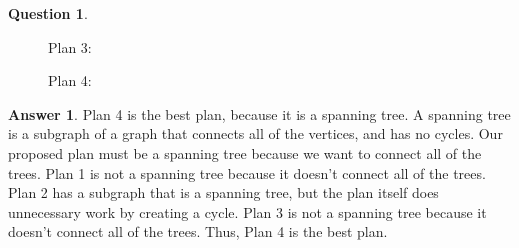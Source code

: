 \documentclass[article, 12pt]{article}
\theoremstyle{definition}
\newtheorem{question}{Question}
\newtheorem{answer}{Answer}
\begin{document}
\begin{question}
\begin{figure}[H]
\begin{minipage}[b]{0.2\linewidth}
            \end{minipage}
            \begin{minipage}[b]{0.2\linewidth}
                \caption*{Plan 3:}
                \centering
            \end{minipage}
            \begin{minipage}[b]{0.2\linewidth}
                \caption*{Plan 4:}
                \centering
            \end{minipage}
        \end{figure}
    \end{question}
    \begin{answer}
        Plan 4 is the best plan, because it is a spanning tree. A spanning tree is a subgraph of a graph that connects all of the vertices, and has no cycles. Our proposed plan must be a spanning tree because we want to connect all of the trees. Plan 1 is not a spanning tree because it doesn't connect all of the trees. Plan 2 has a subgraph that is a spanning tree, but the plan itself does unnecessary work by creating a cycle. Plan 3 is not a spanning tree because it doesn't connect all of the trees. Thus, Plan 4 is the best plan.
    \end{answer}
\end{document}
